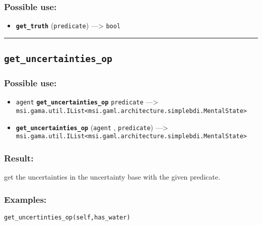 \documentclass[]{book}
\providecommand{\tightlist}{%
  \setlength{\itemsep}{0pt}\setlength{\parskip}{0pt}}
\theoremstyle{definition}
\theoremstyle{definition}
\theoremstyle{definition}
\theoremstyle{remark}
\begin{document}
\subsubsection{Possible use:}\label{possible-use-231}

\begin{itemize}
\tightlist
\item
  \textbf{\texttt{get\_truth}} (\texttt{predicate}) ---\textgreater{}
  \texttt{bool}
\end{itemize}

\begin{center}\rule{0.5\linewidth}{\linethickness}\end{center}

\subsection{\texorpdfstring{\texttt{get\_uncertainties\_op}}{get\_uncertainties\_op}}\label{get_uncertainties_op}

\subsubsection{Possible use:}\label{possible-use-232}

\begin{itemize}
\tightlist
\item
  \texttt{agent} \textbf{\texttt{get\_uncertainties\_op}}
  \texttt{predicate} ---\textgreater{}
  \texttt{msi.gama.util.IList\textless{}msi.gaml.architecture.simplebdi.MentalState\textgreater{}}
\item
  \textbf{\texttt{get\_uncertainties\_op}} (\texttt{agent} ,
  \texttt{predicate}) ---\textgreater{}
  \texttt{msi.gama.util.IList\textless{}msi.gaml.architecture.simplebdi.MentalState\textgreater{}}
\end{itemize}

\subsubsection{Result:}\label{result-224}

get the uncertainties in the uncertainty base with the given predicate.

\subsubsection{Examples:}\label{examples-177}

\begin{verbatim}
get_uncertinties_op(self,has_water) 
\end{verbatim}
\end{document}
